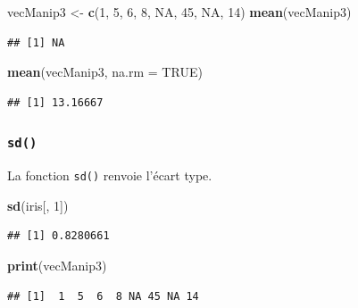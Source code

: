 \documentclass[
]{book}
\newenvironment{Shaded}{\begin{snugshade}}{\end{snugshade}}
\newcommand{\DataTypeTok}[1]{\textcolor[rgb]{0.13,0.29,0.53}{#1}}
\newcommand{\DecValTok}[1]{\textcolor[rgb]{0.00,0.00,0.81}{#1}}
\newcommand{\KeywordTok}[1]{\textcolor[rgb]{0.13,0.29,0.53}{\textbf{#1}}}
\newcommand{\NormalTok}[1]{#1}
\newcommand{\OtherTok}[1]{\textcolor[rgb]{0.56,0.35,0.01}{#1}}
\newcommand{\StringTok}[1]{\textcolor[rgb]{0.31,0.60,0.02}{#1}}
\begin{document}
\begin{Shaded}
\begin{Highlighting}[]
\NormalTok{vecManip3 <-}\StringTok{ }\KeywordTok{c}\NormalTok{(}\DecValTok{1}\NormalTok{, }\DecValTok{5}\NormalTok{, }\DecValTok{6}\NormalTok{, }\DecValTok{8}\NormalTok{, }\OtherTok{NA}\NormalTok{, }\DecValTok{45}\NormalTok{, }\OtherTok{NA}\NormalTok{, }\DecValTok{14}\NormalTok{)}
\KeywordTok{mean}\NormalTok{(vecManip3)}
\end{Highlighting}
\end{Shaded}

\begin{verbatim}
## [1] NA
\end{verbatim}

\begin{Shaded}
\begin{Highlighting}[]
\KeywordTok{mean}\NormalTok{(vecManip3, }\DataTypeTok{na.rm =} \OtherTok{TRUE}\NormalTok{)}
\end{Highlighting}
\end{Shaded}

\begin{verbatim}
## [1] 13.16667
\end{verbatim}

\hypertarget{l015sd}{%
\subsubsection{\texorpdfstring{\texttt{sd()}}{sd()}}\label{l015sd}}

La fonction \texttt{sd()} renvoie l'écart type.

\begin{Shaded}
\begin{Highlighting}[]
\KeywordTok{sd}\NormalTok{(iris[, }\DecValTok{1}\NormalTok{])}
\end{Highlighting}
\end{Shaded}

\begin{verbatim}
## [1] 0.8280661
\end{verbatim}

\begin{Shaded}
\begin{Highlighting}[]
\KeywordTok{print}\NormalTok{(vecManip3)}
\end{Highlighting}
\end{Shaded}

\begin{verbatim}
## [1]  1  5  6  8 NA 45 NA 14
\end{verbatim}
\end{document}
